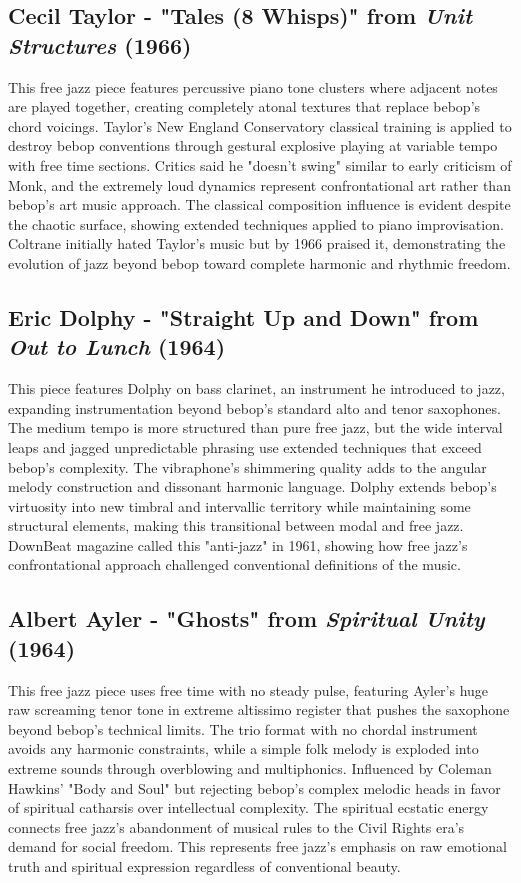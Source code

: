 \documentclass[11pt]{article}
\begin{document}
\subsection*{Cecil Taylor - "Tales (8 Whisps)" from \emph{Unit Structures} (1966)}
This free jazz piece features percussive piano tone clusters where adjacent notes are played together, creating completely atonal textures that replace bebop's chord voicings. Taylor's New England Conservatory classical training is applied to destroy bebop conventions through gestural explosive playing at variable tempo with free time sections. Critics said he "doesn't swing" similar to early criticism of Monk, and the extremely loud dynamics represent confrontational art rather than bebop's art music approach. The classical composition influence is evident despite the chaotic surface, showing extended techniques applied to piano improvisation. Coltrane initially hated Taylor's music but by 1966 praised it, demonstrating the evolution of jazz beyond bebop toward complete harmonic and rhythmic freedom.

\subsection*{Eric Dolphy - "Straight Up and Down" from \emph{Out to Lunch} (1964)}
This piece features Dolphy on bass clarinet, an instrument he introduced to jazz, expanding instrumentation beyond bebop's standard alto and tenor saxophones. The medium tempo is more structured than pure free jazz, but the wide interval leaps and jagged unpredictable phrasing use extended techniques that exceed bebop's complexity. The vibraphone's shimmering quality adds to the angular melody construction and dissonant harmonic language. Dolphy extends bebop's virtuosity into new timbral and intervallic territory while maintaining some structural elements, making this transitional between modal and free jazz. DownBeat magazine called this "anti-jazz" in 1961, showing how free jazz's confrontational approach challenged conventional definitions of the music.

\subsection*{Albert Ayler - "Ghosts" from \emph{Spiritual Unity} (1964)}
This free jazz piece uses free time with no steady pulse, featuring Ayler's huge raw screaming tenor tone in extreme altissimo register that pushes the saxophone beyond bebop's technical limits. The trio format with no chordal instrument avoids any harmonic constraints, while a simple folk melody is exploded into extreme sounds through overblowing and multiphonics. Influenced by Coleman Hawkins' "Body and Soul" but rejecting bebop's complex melodic heads in favor of spiritual catharsis over intellectual complexity. The spiritual ecstatic energy connects free jazz's abandonment of musical rules to the Civil Rights era's demand for social freedom. This represents free jazz's emphasis on raw emotional truth and spiritual expression regardless of conventional beauty.
\end{document}
